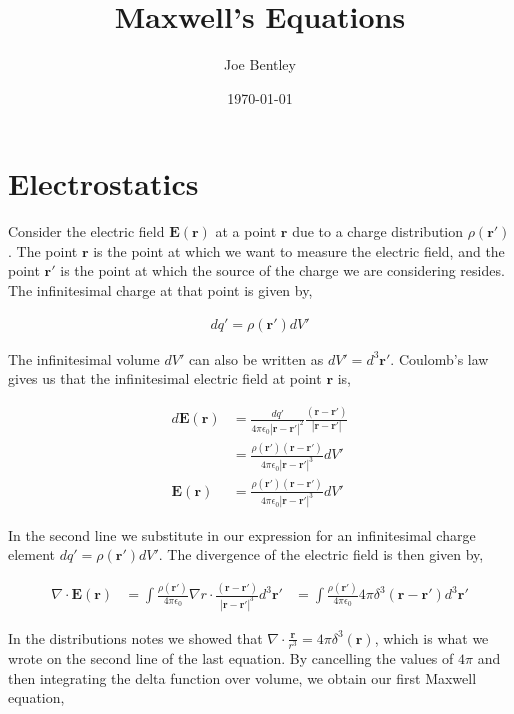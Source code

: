 \documentclass[11pt]{amsart}
\title{Maxwell's Equations}
\author{Joe Bentley}
\date{\today}
\begin{document}
\maketitle

\newpage

\section{Electrostatics}

Consider the electric field $\mathbf{E}(\mathbf{r})$ at a point $\mathbf{r}$ due to a charge distribution $\rho(\mathbf{r'})$. The point $\mathbf{r}$ is the point at which we want to measure the electric field, and the point $\mathbf{r'}$ is the point at which the source of the charge we are considering resides. The infinitesimal charge at that point is given by,

\begin{align*}
  dq' = \rho(\mathbf{r'}) dV'
\end{align*}

The infinitesimal volume $dV'$ can also be written as $dV' = d^3\mathbf{r'}$. Coulomb's law gives us that the infinitesimal electric field at point $\mathbf{r}$ is,

\begin{align*}
  d\mathbf{E}(\mathbf{r}) &= \frac{dq'}{4\pi\epsilon_0 {|\mathbf{r}-\mathbf{r'}|}^2} \frac{(\mathbf{r} - \mathbf{r'})}{|\mathbf{r}-\mathbf{r'}|} \\
  &= \frac{\rho(\mathbf{r'})(\mathbf{r}-\mathbf{r'})}{4\pi\epsilon_0{|\mathbf{r}-\mathbf{r'}|}^3} dV' \\
  \mathbf{E}(\mathbf{r}) &= \frac{\rho(\mathbf{r'})(\mathbf{r}-\mathbf{r'})}{4\pi\epsilon_0{|\mathbf{r}-\mathbf{r'}|}^3} dV'
\end{align*}

In the second line we substitute in our expression for an infinitesimal charge element $dq' = \rho(\mathbf{r'}) dV'$. The divergence of the electric field is then given by,

\begin{align*}
  \nabla\cdot\mathbf{E}(\mathbf{r}) &= \int\frac{\rho(\mathbf{r'})}{4\pi\epsilon_0} \nabla r \cdot \frac{(\mathbf{r}-\mathbf{r'})}{{|\mathbf{r}-\mathbf{r'}|}^3} d^3\mathbf{r'}
  &= \int \frac{\rho(\mathbf{r'})}{4\pi\epsilon_0} 4\pi\delta^3(\mathbf{r} - \mathbf{r'}) d^3\mathbf{r'}
\end{align*}

In the distributions notes we showed that $\nabla\cdot\frac{\mathbf{r}}{r^3}=4\pi\delta^3(\mathbf{r})$, which is what we wrote on the second line of the last equation. By cancelling the values of $4\pi$ and then integrating the delta function over volume, we obtain our first Maxwell equation,
\end{document}
